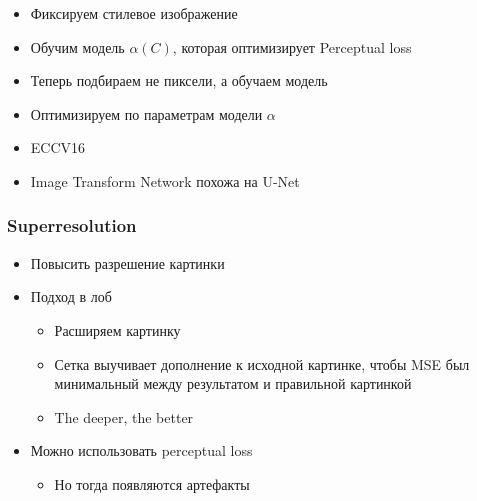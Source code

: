 \documentclass[a4paper, 12pt]{article}
\begin{document}
\begin{itemize}
\item
  
  Фиксируем стилевое изображение
  
\item
  
  Обучим модель \(\alpha(C)\), которая оптимизирует Perceptual loss
  
\item
  
  Теперь подбираем не пиксели, а обучаем модель
  
\item
  
  Оптимизируем по параметрам модели \(\alpha\)
  
\item
  
  ECCV16
  
\item
  
  Image Transform Network похожа на U-Net
  
\end{itemize}

\subsubsection{Superresolution}\label{superresolution}

\begin{itemize}
\item
  
  Повысить разрешение картинки
  
\item
  
  Подход в лоб
  

  \begin{itemize}
  \item
    
    Расширяем картинку
    
  \item
    
    Сетка выучивает дополнение к исходной картинке, чтобы MSE был
    минимальный между результатом и правильной картинкой
    
  \item
    
    The deeper, the better
    
  \end{itemize}
\item
  
  Можно использовать perceptual loss
  

  \begin{itemize}
  \item
    
    Но тогда появляются артефакты
    
  \end{itemize}
\end{itemize}
\end{document}
